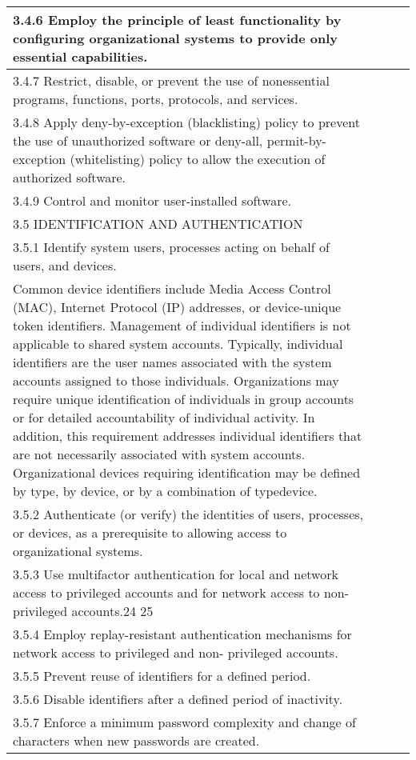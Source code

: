 \begin{longtable} {|p{}|p{}|p{}|p{} |}
{3.4.6 Employ the principle of least functionality by configuring organizational systems to provide only essential capabilities.}&&& \\ \hline
{3.4.7 Restrict, disable, or prevent the use of nonessential programs, functions, ports, protocols, and services.}&&& \\ \hline
{3.4.8 Apply deny-by-exception (blacklisting) policy to prevent the use of unauthorized software or deny-all, permit-by-exception (whitelisting) policy to allow the execution of authorized software.}&&& \\ \hline
{3.4.9 Control and monitor user-installed software.}&&& \\ \hline
{3.5 IDENTIFICATION AND AUTHENTICATION}&&& \\ \hline
{3.5.1 Identify system users, processes acting on behalf of users, and devices.}&&& \\ \hline
{Common device identifiers include Media Access Control (MAC), Internet Protocol (IP) addresses, or device-unique token identifiers. Management of individual identifiers is not applicable to shared system accounts. Typically, individual identifiers are the user names associated with the system accounts assigned to those individuals. Organizations may require unique identification of individuals in group accounts or for detailed accountability of individual activity. In addition, this requirement addresses individual identifiers that are not necessarily associated with system accounts. Organizational devices requiring identification may be defined by type, by device, or by a combination of type\/device.}&&& \\ \hline
{3.5.2 Authenticate (or verify) the identities of users, processes, or devices, as a prerequisite to allowing access to organizational systems.}&&& \\ \hline
{3.5.3 Use multifactor authentication for local and network access to privileged accounts and for network access to non-privileged accounts.24 25}&&& \\ \hline
{3.5.4 Employ replay-resistant authentication mechanisms for network access to privileged and non- privileged accounts.}&&& \\ \hline
{3.5.5 Prevent reuse of identifiers for a defined period.}&&& \\ \hline
{3.5.6 Disable identifiers after a defined period of inactivity.}&&& \\ \hline
{3.5.7 Enforce a minimum password complexity and change of characters when new passwords are created.}&&& \\ \hline

\end{longtable}
